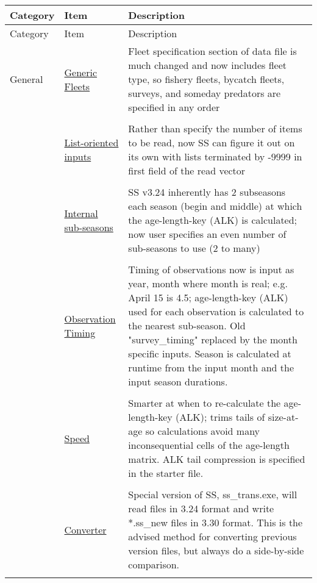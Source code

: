 \documentclass[12pt]{article}
\begin{document}
\begin{center}
	\begin{longtable}{p{2cm} p{3cm} p{10cm}}
	Category & Item & Description\\
	\hline
	\endfirsthead
	
	Category & Item & Description\\
	\hline
	\endhead
	
	\hline
	\endfoot
	
	\endlastfoot
	
	General & 
	\hyperlink{GenericFleets}{Generic Fleets} & 
	Fleet specification section of data file is much changed and now includes fleet type, so fishery fleets, bycatch fleets, surveys, and someday predators are specified in any order\\
	\\
	& \hyperlink{ListBased}{List-oriented inputs} & 
	Rather than specify the number of items to be read, now SS can figure it out on its own with lists terminated by -9999 in first field of the read vector \\
	\\					  
	& \hyperlink{SubSeas}{Internal sub-seasons} & 
	SS v3.24 inherently has 2 subseasons each season (begin and middle) at which the age-length-key (ALK) is calculated; now user specifies an even number of sub-seasons to use (2 to many) \\
	\\
	& \hyperlink{ObsTiming}{Observation Timing} & 
	Timing of observations now is input as year, month where month is real; e.g. April 15 is 4.5; age-length-key (ALK) used for each observation is calculated to the nearest sub-season.  Old "survey\_timing" replaced by the month specific inputs.  Season is calculated at runtime from the input month and the input season durations. \\
	\\
	& \hyperlink{ALK}{Speed} & 
	Smarter at when to re-calculate the age-length-key (ALK); trims tails of size-at-age so calculations avoid many inconsequential cells of the age-length matrix. ALK tail compression is specified in the starter file.\\
	\\				
	& \hyperlink{Convert} {Converter} & 
	Special version of SS, ss\_trans.exe, will read files in 3.24 format and write *.ss\_new files in 3.30 format.  This is the advised method for converting previous version files, but always do a side-by-side comparison.\\
	\\

\end{longtable}
\end{center}
\end{document}
